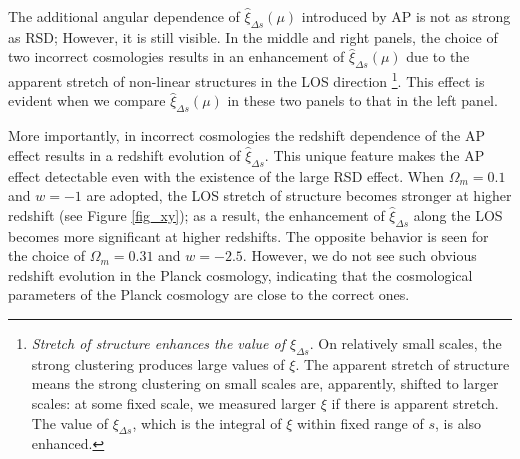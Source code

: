 \documentclass[iop]{emulateapj}
\begin{document}


The additional angular dependence of $\hat \xi_{\Delta s}(\mu)$ introduced by AP is not as strong as RSD;
However, it is still visible. 
In the middle and right panels, %
the choice of two incorrect cosmologies results in an enhancement of  $\hat \xi_{\Delta s}(\mu)$ due to the 
apparent stretch of non-linear structures in the LOS direction
\footnote{{\it Stretch of structure enhances the value of $\xi_{\Delta s}$}.
On relatively small scales, the strong clustering produces large values of $\xi$.
The apparent stretch of structure means the strong clustering on small scales are, apparently, shifted to larger scales:
at some fixed scale, we measured larger $\xi$ if there is apparent stretch.
The value of $\xi_{\Delta s}$, which is the integral of $\xi$ within fixed range of $s$, is also enhanced.}.
This effect is evident when we compare  $\hat \xi_{\Delta s}(\mu)$ in these two panels to that in the left panel.

More importantly, in incorrect cosmologies the redshift dependence of the AP effect results in a redshift evolution of $\hat \xi_{\Delta s}$.
This unique feature makes the AP effect detectable even with the existence of the large RSD effect. %
When $\Omega_m=0.1$ and $w=-1$ are adopted, 
the LOS stretch of structure becomes stronger at higher redshift (see Figure \ref{fig_xy});
as a result, the enhancement of $\hat \xi_{\Delta s}$ along the LOS 
becomes more significant at higher redshifts.
The opposite behavior is seen for the choice of $\Omega_m=0.31$ and $w=-2.5$.
However, we do not see such obvious redshift evolution in the Planck cosmology, %
 indicating that the cosmological parameters of the Planck cosmology are close to the correct ones.
\end{document}
